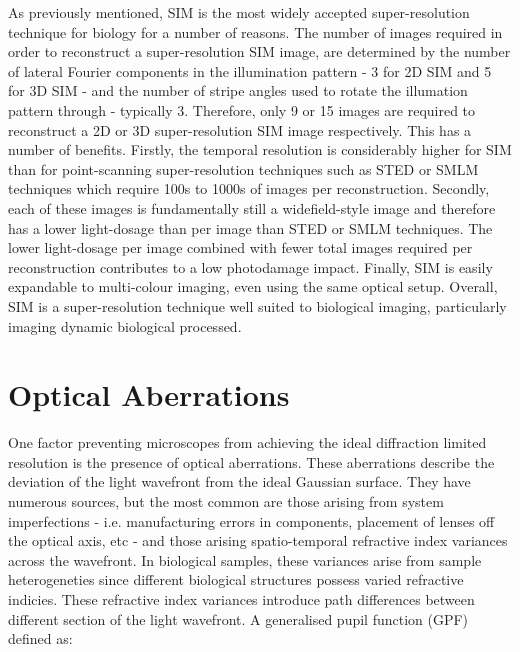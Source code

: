 As previously mentioned, SIM is the most widely accepted 
super-resolution technique for biology for a number of reasons. The 
number of images required in order to reconstruct a super-resolution 
SIM image, are determined by the number of lateral Fourier components 
in the illumination pattern - 3 for 2D SIM and 5 for 3D SIM - and the
number of stripe angles used to rotate the illumation pattern through
- typically 3. Therefore, only 9 or 15 images are required to 
reconstruct a 2D or 3D super-resolution SIM image respectively. This
has a number of benefits. Firstly, the temporal resolution is 
considerably higher for SIM than for point-scanning super-resolution
techniques such as STED or SMLM techniques which require 100s to 1000s
of images per reconstruction\cite{leung2011review,schermelleh2019super}.
Secondly, each of these images is fundamentally still a widefield-style
image and therefore has a lower light-dosage than per image than STED 
or SMLM techniques. The lower light-dosage per image combined with fewer
total images required per reconstruction contributes to a low 
photodamage impact. Finally, SIM is easily expandable to multi-colour 
imaging, even using the same optical 
setup\cite{wu2018faster,allen2014structured}. Overall, SIM is a 
super-resolution technique well suited to biological imaging, 
particularly imaging dynamic biological processed.

\section{Optical Aberrations}
\label{sec:aberrations}

One factor preventing microscopes from achieving the ideal diffraction
limited resolution is the presence of optical 
aberrations\cite{goodman2005introduction,wyant1992basic,wolf1951diffraction}.
These aberrations describe the deviation of the light wavefront
from the ideal Gaussian surface. They have numerous sources, but the most
common are those arising from system imperfections - i.e. manufacturing errors
in components, placement of lenses off the optical axis, etc - and those
arising spatio-temporal refractive index variances across the 
wavefront\cite{kubby2013adaptive,booth2007adaptive}. In biological samples, 
these variances arise from sample heterogeneties since different biological
structures possess varied refractive 
indicies\cite{bashkatov2011optical, jacques2013optical, kim2010measurement, sandell2011review}.
These refractive index variances introduce path differences between 
different section of the light wavefront. A generalised pupil function 
(GPF) defined as\cite{antonello2014optimisation}:

